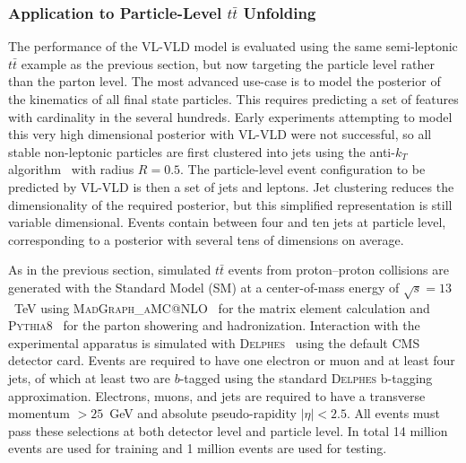 \subsubsection{Application to Particle-Level \texorpdfstring{$t\bar{t}$}{ttbar} Unfolding}

The performance of the VL-VLD model is evaluated using the same semi-leptonic $t\bar{t}$ example as the previous section, but now targeting the particle level rather than the parton level.
The most advanced use-case is to model the posterior of the kinematics of all final state particles.
This requires predicting a set of features with cardinality in the several hundreds.
Early experiments attempting to model this very high dimensional posterior with VL-VLD were not successful, so all stable non-leptonic particles are first clustered into jets using the anti-$k_T$ algorithm~\cite{Cacciari:2008gp} with radius $R = 0.5$.
The particle-level event configuration to be predicted by VL-VLD is then a set of jets and leptons.
Jet clustering reduces the dimensionality of the required posterior, but this simplified representation is still variable dimensional.
Events contain between four and ten jets at particle level, corresponding to a posterior with several tens of dimensions on average.

As in the previous section, simulated $t\bar{t}$ events from proton--proton collisions are generated with the Standard Model (SM) at a center-of-mass energy of $\sqrt{s}=13$~TeV using \textsc{MadGraph\_aMC@NLO}~\cite{Alwall:2014hca} for the matrix element calculation and \textsc{Pythia8}~\cite{Sjostrand:2014zea} for the parton showering and hadronization.
Interaction with the experimental apparatus is simulated with \textsc{Delphes}~\cite{deFavereau:2013fsa} using the default CMS detector card.
Events are required to have one electron or muon and at least four jets, of which at least two are $b$-tagged using the standard \textsc{Delphes} b-tagging approximation.
Electrons, muons, and jets are required to have a transverse momentum \pt $> 25$~GeV and absolute pseudo-rapidity $|\eta| < 2.5$.
All events must pass these selections at both detector level and particle level.
In total 14 million events are used for training and 1 million events are used for testing.

